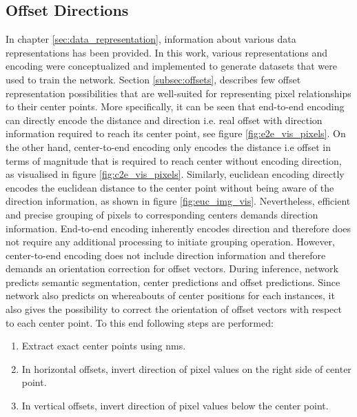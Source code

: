 \subsection{Offset Directions}

In chapter \ref{sec:data_representation}, information about various data representations has been provided. In this work, various representations and encoding were conceptualized and implemented to generate datasets that were used to train the network. Section \ref{subsec:offsets}, describes few offset representation possibilities that are well-suited for representing pixel relationships to their center points. More specifically, it can be seen that end-to-end encoding can directly encode the distance and direction i.e. real offset with direction information required to reach its center point, see figure \ref{fig:e2e_vis_pixels}. On the other hand, center-to-end encoding only encodes the distance i.e  offset in terms of magnitude that is required to reach center without encoding direction, as visualised in figure \ref{fig:c2e_vis_pixels}. Similarly, euclidean encoding directly encodes the euclidean distance to the center point without being aware of the direction information, as shown in figure \ref{fig:euc_img_vis}. Nevertheless, efficient and precise grouping of pixels to corresponding centers demands direction information. End-to-end encoding inherently encodes direction and therefore does not require any additional processing to initiate grouping operation. However, center-to-end encoding does not include direction information and therefore demands an orientation correction for offset vectors. During inference, network predicts semantic segmentation, center predictions and offset predictions. Since network also predicts on whereabouts of center positions for each instances, it also gives the possibility to correct the orientation of offset vectors with respect to each center point. To this end following steps are performed:
\bigskip

\begin{enumerate}
    \item Extract exact center points using \gls{nms}. 
    \item In horizontal offsets, invert direction of pixel values on the right side of center point.
    \item In vertical offsets, invert direction of pixel values below the center point.
\end{enumerate}

